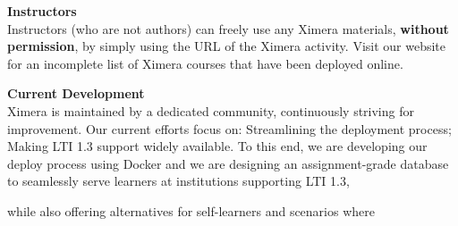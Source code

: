 \documentclass{article}
\begin{document}
\begin{multicols}{2}
    \begin{xframe}
        {\sffamily\bfseries Instructors}\\
        Instructors (who are not authors) can freely use any Ximera materials,
        \textbf{without permission}, by simply using the URL of the Ximera
        activity. Visit our website for an incomplete list of Ximera courses
        that
        have
        been deployed online.
    \end{xframe}
    \begin{xframe}
        {\sffamily\bfseries Current Development}\\
        Ximera is maintained by a dedicated community, continuously striving
        for
        improvement. Our current efforts focus on: Streamlining the deployment
        process; Making LTI 1.3 support widely available. To this end, we are
        developing our
        deploy process using Docker and we are designing an assignment-grade
        database
        to
        seamlessly serve  learners at institutions supporting LTI 1.3,
        \begin{center}
        \end{center}
        while also offering alternatives for self-learners and scenarios where

\end{xframe}
\end{multicols}
\end{document}
